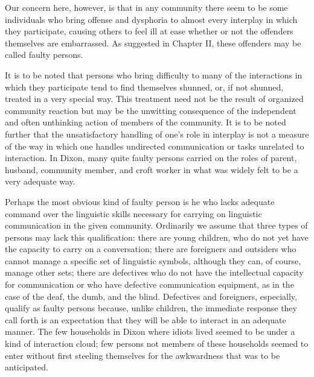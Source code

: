 \documentclass[openany,nobib]{tufte-book}
\begin{document}
Our concern here, however, is that in any community there seem to be
some individuals who bring offense and dysphoria to almost every
interplay in which they participate, causing others to feel ill at ease
whether or not the offenders themselves are embarrassed. As suggested in
Chapter II, these offenders may be called faulty persons.

It is to be noted that persons who bring difficulty to many of the
interactions in which they participate tend to find themselves shunned,
or, if not shunned, treated in a very special way. This treatment need
not be the result of organized community reaction but may be the
unwitting consequence of the independent and often unthinking action of
members of the community. It is to be noted further that the
unsatisfactory handling of one's role in interplay is not a measure of
the way in which one handles undirected communication or tasks unrelated
to interaction. In Dixon, many quite faulty persons carried on the roles
of parent, husband, community member, and croft worker in what was
widely felt to be a very adequate way.

Perhaps the most obvious kind of faulty person is he who lacks adequate
command over the linguistic skills necessary for carrying on linguistic
communication in the given community. Ordinarily we assume that three
types of persons may lack this qualification: there are young children,
who do not yet have the capacity to carry on a conversation; there are
foreigners and outsiders who cannot manage a specific set of linguistic
symbols, although they can, of course, manage other sets; there are
defectives who do not have the intellectual capacity for communication
or who have defective communication equipment, as in the case of the
deaf, the dumb, and the blind. Defectives and foreigners, especially,
qualify as faulty persons because, unlike children, the immediate
response they call forth is an expectation that they will be able to
interact in an adequate manner. The few households in Dixon where idiots
lived seemed to be under a kind of interaction cloud; few persons not
members of these households seemed to enter without first steeling
themselves for the awkwardness that was to be anticipated.
\end{document}
